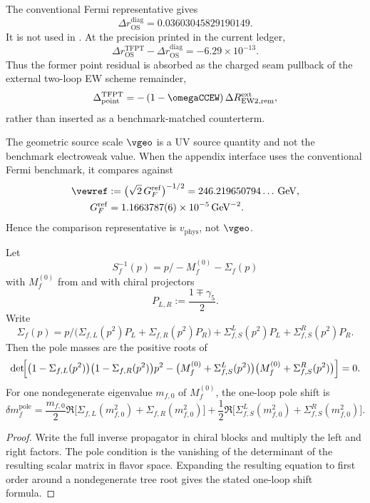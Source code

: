 \begin{remark}
The conventional Fermi representative gives
\[
\Delta r_{\mathrm{OS}}^{\mathrm{diag}}
=
0.03603045829190149.
\]
It is not used in . At the precision printed in the current
ledger,
\[
\Delta r_{\mathrm{OS}}^{\mathrm{TFPT}}
-
\Delta r_{\mathrm{OS}}^{\mathrm{diag}}
=
-6.29\times10^{-13}.
\]
Thus the former point residual is absorbed as the charged seam pullback of the external two-loop EW
scheme remainder,
\[
\Delta_{\mathrm{point}}^{\mathrm{TFPT}}
=
-\left(1-\omegaCCEW\right)
\Delta R_{\mathrm{EW2},\mathrm{rem}}^{\mathrm{ext}},
\]
rather than inserted as a benchmark-matched counterterm.
\end{remark}
\begin{remark}
The geometric source scale $\vgeo$ is a UV source quantity and not the benchmark electroweak value.
When the appendix interface uses the conventional Fermi benchmark, it compares against
\[
\begin{aligned}
\vewref
&:=
\bigl(\sqrt2\,G_F^{\mathrm{ref}}\bigr)^{-1/2}
=
246.219650794\ldots\,\mathrm{GeV},
\\
G_F^{\mathrm{ref}}
&=
1.1663787(6)\times 10^{-5}\,\mathrm{GeV}^{-2}.
\end{aligned}
\]
Hence the comparison representative is $v_{\mathrm{phys}}$, not $\vgeo$.
\end{remark}

\begin{theorem}
\label{thm:dirac-pole-matching}
Let
\[
S_f^{-1}(p)=p\!\!\!/-M_f^{(0)}-\Sigma_f(p)
\]
with $M_f^{(0)}$ from  and with chiral projectors
\[
P_{L,R}:=\frac{1\mp\gamma_5}{2}.
\]
Write
\[
\Sigma_f(p)=
p\!\!\!/\bigl(\Sigma_{f,L}(p^2)P_L+\Sigma_{f,R}(p^2)P_R\bigr)
+\Sigma_{f,S}^L(p^2)P_L+\Sigma_{f,S}^R(p^2)P_R.
\]
Then the pole masses are the positive roots of
\[
\det\!\Bigl[
\bigl(1-\Sigma_{f,L}(p^2)\bigr)\bigl(1-\Sigma_{f,R}(p^2)\bigr)p^2
-\bigl(M_f^{(0)}+\Sigma_{f,S}^L(p^2)\bigr)\bigl(M_f^{(0)}+\Sigma_{f,S}^R(p^2)\bigr)
\Bigr]=0.
\]
For one nondegenerate eigenvalue $m_{f,0}$ of $M_f^{(0)}$, the one-loop pole shift is
\[
\delta m_f^{\mathrm{pole}}
=
\frac{m_{f,0}}{2}\Re\bigl[\Sigma_{f,L}(m_{f,0}^2)+\Sigma_{f,R}(m_{f,0}^2)\bigr]
+\frac12\Re\bigl[\Sigma_{f,S}^L(m_{f,0}^2)+\Sigma_{f,S}^R(m_{f,0}^2)\bigr].
\]
\end{theorem}

\begin{proof}
Write the full inverse propagator in chiral blocks and multiply the left and right factors. The
pole condition is the vanishing of the determinant of the resulting scalar matrix in flavor space.
Expanding the resulting equation to first order around a nondegenerate tree root gives the stated
one-loop shift formula.
\end{proof}


